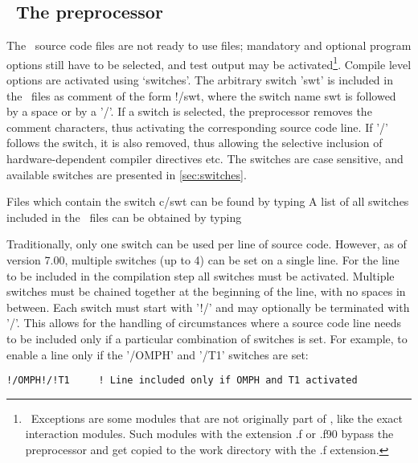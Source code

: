 \vssub
\subsection{~The preprocessor} \label{sec:w3adc}
\vssub

The \ws\ source code files are not ready to use {\fortran} files; mandatory
and optional program options still have to be selected, and test output may be
activated\footnote{~Exceptions are some modules that are not originally part
  of \ws, like the exact interaction modules. Such modules with the extension
  {\file .f} or {\file .f90} bypass the preprocessor and get copied to the
  work directory with the {\file .f} extension.}. Compile level options are
activated using `switches'. The arbitrary switch '{\F swt}' is included in the
\ws\ files as comment of the form {\F !/swt}, where the switch name {\F swt}
is followed by a space or by a '{\F /}'. If a switch is selected, the
preprocessor removes the comment characters, thus activating the corresponding
source code line. If '{\F/}' follows the switch, it is also removed, thus
allowing the selective inclusion of hardware-dependent compiler directives
etc. The switches are case sensitive, and available switches are presented in
\para\ref{sec:switches}.

Files which contain the switch {\F c/swt} can be
found by typing  A list of all switches included
in the \ws\ files can be obtained by typing 

\pb
\noindent
Traditionally, only one switch can be used per line of source code. However,
as of {\ww} version 7.00, multiple switches (up to 4) can be set on a single
line. For the line to be included in the compilation step all switches must
be activated. Multiple switches must be chained together at the beginning of
the line, with no spaces in between. Each switch must start with '{\F !/}' and
may optionally be terminated with '{\F /}'. This allows for the handling of
circumstances where a source code line needs to be included only if a
particular combination of switches is set. For example, to enable a line only
if the '{\F /OMPH}' and '{\F /T1}' switches are set:

\begin{footnotesize}
\begin{verbatim}
!/OMPH!/!T1     ! Line included only if OMPH and T1 activated
\end{verbatim}
\end{footnotesize}

